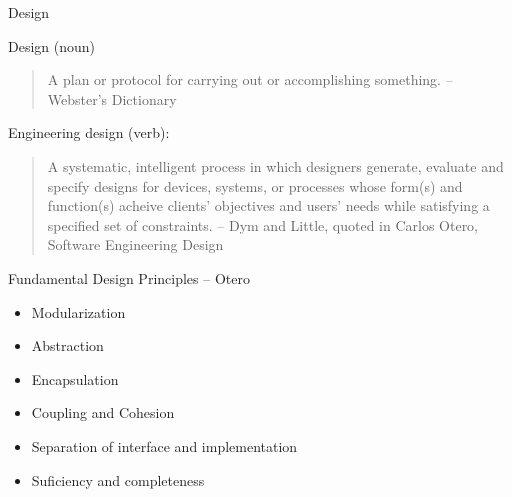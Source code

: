 \documentclass{beamer}
\author[Chris Simpkins] 
{Christopher Simpkins \\\texttt{chris.simpkins@gatech.edu}}
\institute[Georgia Tech] %
\date[CS 1331]{}
\begin{document}
\begin{frame}
  \titlepage
\end{frame}



\begin{frame}[fragile]{Design}


Design (noun)
\begin{quote}
A plan or protocol for carrying out or accomplishing something. -- Webster's Dictionary
\end{quote}

Engineering design (verb):
\begin{quote}
A systematic, intelligent process in which designers generate, evaluate and specify designs for devices, systems, or processes whose form(s) and function(s) acheive clients' objectives and users' needs while satisfying a specified set of constraints. -- Dym and Little, quoted in Carlos Otero, Software Engineering Design
\end{quote}


\end{frame}

\begin{frame}[fragile]{Fundamental Design Principles -- Otero}

\begin{itemize}
\item Modularization
\item Abstraction
\item Encapsulation
\item Coupling and Cohesion
\item Separation of interface and implementation
\item Suficiency and completeness
\end{itemize}


\end{frame}
\end{document}
